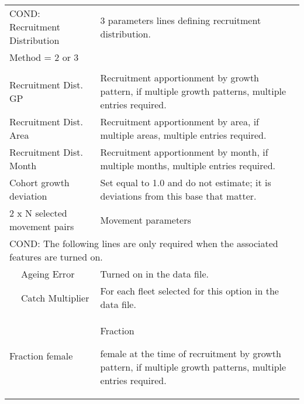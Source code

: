\begin{longtable}{p{1cm} p{2.25cm} p{10cm}}
	\multicolumn{2}{l}{COND: Recruitment Distribution } \Tstrut & 3 parameters lines defining recruitment distribution.\\
	\multicolumn{2}{l}{ Method = 2 or 3} \Tstrut & \\
	& & \\
	\multicolumn{2}{l}{Recruitment Dist. GP} \Tstrut & Recruitment apportionment by growth pattern, if multiple growth patterns, multiple entries required.\\
	\multicolumn{2}{l}{Recruitment Dist. Area} & Recruitment apportionment by area, if multiple areas, multiple entries required.\\
	\multicolumn{2}{l}{Recruitment Dist. Month} & Recruitment apportionment by month, if multiple months, multiple entries required.\Bstrut\\
	\hline


	\multicolumn{2}{l}{Cohort growth deviation} \Tstrut & Set equal to 1.0 and do not estimate; it is deviations from this base that matter.\Bstrut\\
	\hline

	\multicolumn{2}{l}{2 x N selected movement pairs} & Movement parameters\Tstrut\Bstrut\\
	\hline

	\multicolumn{3}{l}{COND: The following lines are only required when the associated features are turned on.}\Tstrut\\
	& Ageing Error & Turned on in the data file.\\
	& Catch Multiplier & For each fleet selected for this option in the data file.\\
	\hline

	\multicolumn{2}{l}{Fraction female}\Tstrut & \hypertarget{SexRatio}{Fraction} female at the time of recruitment by growth pattern, if multiple growth patterns, multiple entries required.\Bstrut\\
	\hline
\end{longtable}


